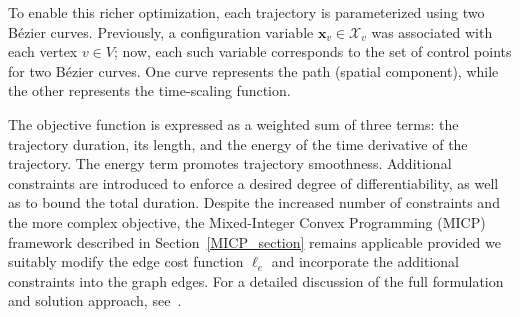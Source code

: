 To enable this richer optimization, each trajectory is parameterized using two B\'ezier curves. Previously, a configuration variable \(\mathbf{x}_v \in \mathcal{X}_v\) was associated with each vertex \(v \in V\); now, each such variable corresponds to the set of control points for two B\'ezier curves. One curve represents the path (spatial component), while the other represents the time-scaling function.

The objective function is expressed as a weighted sum of three terms: the trajectory duration, its length, and the energy of the time derivative of the trajectory. The energy term promotes trajectory smoothness. Additional constraints are introduced to enforce a desired degree of differentiability, as well as to bound the total duration. Despite the increased number of constraints and the more complex objective, the Mixed-Integer Convex Programming (MICP) framework described in Section~\ref{MICP_section} remains applicable provided we suitably modify the edge cost function \({\ell_e}\) and incorporate the additional constraints into the graph edges. For a detailed discussion of the full formulation and solution approach, see~\cite{marcucci2023motion}.